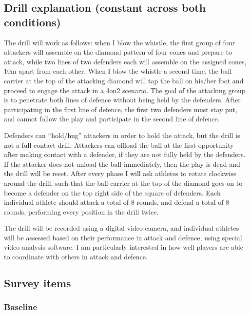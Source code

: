 \subsection{\label{app6:drillExplanation}Drill explanation (constant across both conditions)}
The drill will work as follows:  when I blow the whistle, the first group of four attackers will assemble on the diamond pattern of four cones and prepare to attack, while two lines of two defenders each will assemble on the assigned cones, 10m apart from each other.  When I blow the whistle a second time, the ball carrier at the top of the attacking diamond will tap the ball on his/her foot and proceed to engage the attack in a 4on2 scenario.  The goal of the attacking group is to penetrate both lines of defence without being held by the defenders.  After participating in the first line of defence, the first two defenders must stay put, and cannot follow the play and participate in the second line of defence.

Defenders can “hold/hug” attackers in order to hold the attack, but the drill is not a full-contact drill.  Attackers can offload the ball at the first opportunity after making contact with a defender, if they are not fully held by the defenders.  If the attacker does not unload the ball immediately, then the play is dead and the drill will be reset.
After every phase I will ask athletes to rotate clockwise around the drill, such that the ball carrier at the top of the diamond goes on to become a defender on the top right side of the square of defenders. Each individual athlete should attack a total of 8 rounds, and defend a total of 8 rounds, performing every position in the drill twice.

The drill will be recorded using a digital video camera, and individual athletes will be assessed based on their performance in attack and defence, using special video analysis software. I am particularly interested in how well players are able to coordinate with others in attack and defence.





\subsection{\label{app6:surveyItems}Survey items}



\subsubsection{\label{app6:surveyItemsBaseline}Baseline}

